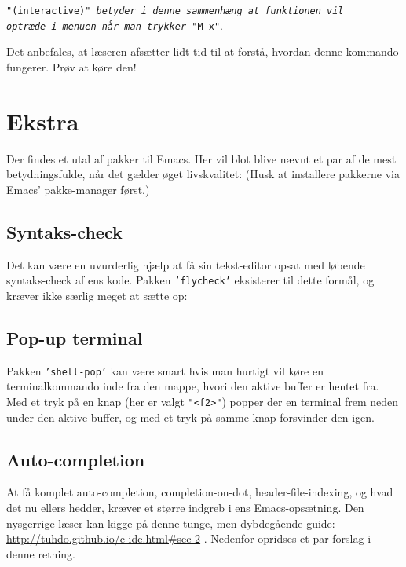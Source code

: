 \documentclass[a4paper, 9pt]{article}
\newcommand{\key}[1]{\texttt{"#1"}}
\newcommand{\package}[1]{\texttt{'#1'}}
\newcommand{\lstline}{\vspace{-3mm}\hrulefill\vspace{2mm}\newline}
\newcommand{\customlisting}[3]{\lstline}
\begin{document}
\vspace{-7mm}\begin{center}\footnotesize\texttt{"(interactive)" \textit{betyder i denne sammenhæng at funktionen vil\\ optræde i menuen når man trykker} \key{M-x}}.\end{center}


Det anbefales, at læseren afsætter lidt tid til at forstå, hvordan denne kommando fungerer. Prøv at køre den!


\newpage
\section{Ekstra}
Der findes et utal af pakker til Emacs. Her vil blot blive nævnt et par af de mest betydningsfulde, når det gælder øget livskvalitet: (Husk at installere pakkerne via Emacs' pakke-manager først.)

\subsection*{Syntaks-check}
Det kan være en uvurderlig hjælp at få sin tekst-editor opsat med løbende syntaks-check af ens kode. Pakken \package{flycheck} eksisterer til dette formål, og kræver ikke særlig meget at sætte op:

\customlisting{ELisp}{init.el}{activate-flycheck.el}


\subsection*{Pop-up terminal}
Pakken \package{shell-pop} kan være smart hvis man hurtigt vil køre en terminalkommando inde fra den mappe, hvori den aktive buffer er hentet fra. Med et tryk på en knap (her er valgt \key{<f2>}) popper der en terminal frem neden under den aktive buffer, og med et tryk på samme knap forsvinder den igen.

\customlisting{ELisp}{init.el}{shell-pop.el}


\subsection*{Auto-completion}
At få komplet auto-completion, completion-on-dot, header-file-indexing, og hvad det nu ellers hedder, kræver et større indgreb i ens Emacs-opsætning. Den nysgerrige læser kan kigge på denne tunge, men dybdegående guide: \url{http://tuhdo.github.io/c-ide.html#sec-2} . Nedenfor opridses et par forslag i denne retning.
\end{document}
